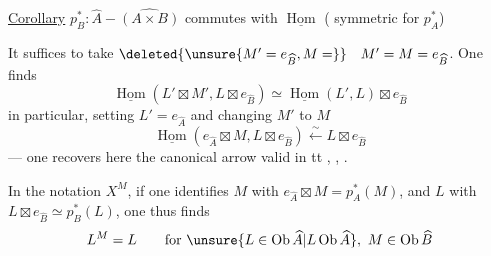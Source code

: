 \uline{Corollary} $p_B^*: \widehat A\mathbin{-}\widehat{(A\times B)}$ commutes with $\underline{\operatorname{Hom}}$
( symmetric for $p_A^*$)

It suffices to take $\deleted{\unsure{M'=e_{\widehat B},M=}}\quad M'=M=e_{\widehat B}$. One finds
\[
\underline{\operatorname{Hom}}(L'\boxtimes M',L\boxtimes e_{\widehat B})\simeq\underline{\operatorname{Hom}}(L',L)\boxtimes e_{\widehat B}
\]
in particular, setting $L'=e_{\widehat A}$ and changing $M'$ to $M$
\[
\underline{\operatorname{Hom}}(e_{\widehat A}\boxtimes M,L\boxtimes e_{\widehat B})\xleftarrow{\sim}L\boxtimes e_{\widehat B}
\]
--- one recovers here the   canonical arrow
valid in tt , , .

In the notation $X^M$, if one identifies $M$ with $e_{\widehat A}\boxtimes M=p_A^*(M)$, and  $L$ with $L\boxtimes e_{\widehat B}\simeq p_B^*(L)$, one thus finds
\[
L^M=L\qquad\text{for }\unsure{L\in\operatorname{Ob}\widehat A|L\operatorname{Ob}\widehat A},\ M\in\operatorname{Ob}\widehat B
\]
